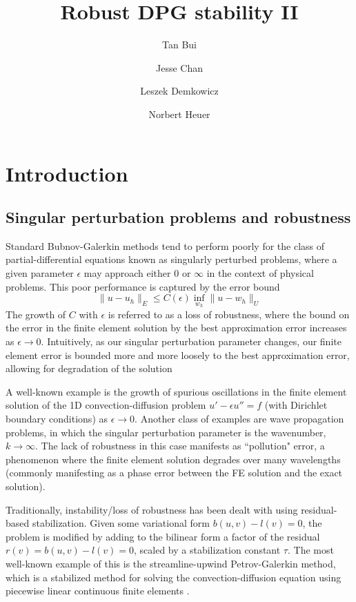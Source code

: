 \documentclass[11pt,onecolumn]{scrartcl}
\author{Tan Bui \and Jesse Chan \and Leszek Demkowicz \and Norbert Heuer}
\title{Robust DPG stability II}
\date{}
\begin{document}
\tableofcontents
\maketitle

\section{Introduction}

\subsection{Singular perturbation problems and robustness}

Standard Bubnov-Galerkin methods tend to perform poorly for the class of partial-differential equations known as singularly perturbed problems, where a given parameter $\epsilon$ may approach either $0$ or $\infty$ in the context of physical problems.  This poor performance is captured by the error bound
\[
\|u-u_h\|_E \leq C(\epsilon) \inf_{w_h}\|u-w_h\|_U
\]
The growth of $C$ with $\epsilon$ is referred to as a loss of robustness, where the bound on the error in the finite element solution by the best approximation error increases as $\epsilon\rightarrow 0$.  Intuitively, as our singular perturbation parameter changes, our finite element error is bounded more and more loosely to the best approximation error, allowing for degradation of the solution   

A well-known example is the growth of spurious oscillations in the finite element solution of the 1D convection-diffusion problem $ u'-\epsilon u'' = f$ (with Dirichlet boundary conditions) as $\epsilon\rightarrow 0$.  Another class of examples are wave propagation problems, in which the singular perturbation parameter is the wavenumber, $k\rightarrow \infty$.  The lack of robustness in this case manifests as ``pollution" error, a phenomenon where the finite element solution degrades over many wavelengths (commonly manifesting as a phase error between the FE solution and the exact solution).  

Traditionally, instability/loss of robustness has been dealt with using residual-based stabilization.  Given some variational form $b(u,v) - l(v)=0$, the problem is modified by adding to the bilinear form a factor of the residual $r(v) = b(u,v) - l(v)=0$, scaled by a stabilization constant $\tau$.  The most well-known example of this is the streamline-upwind Petrov-Galerkin method, which is a stabilized method for solving the convection-diffusion equation using piecewise linear continuous finite elements \cite{SUPG}.  
\end{document}
